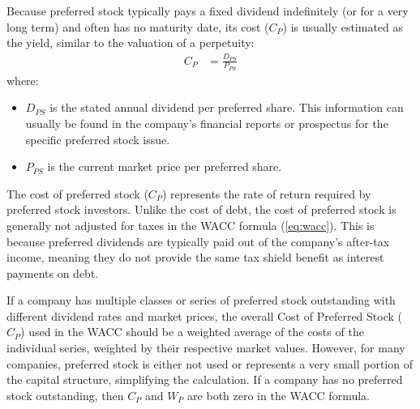 Because preferred stock typically pays a fixed dividend indefinitely (or for a very long term) and often has no maturity date, its cost (\(C_P\)) is usually estimated as the yield, similar to the valuation of a perpetuity:
\begin{align*}
    C_P & = \frac{D_{PS}}{P_{PS}}
\end{align*}
where:
\begin{itemize}
    \item \(D_{PS}\) is the stated annual dividend per preferred share. This information can usually be found in the company's financial reports or prospectus for the specific preferred stock issue.
    \item \(P_{PS}\) is the current market price per preferred share.
\end{itemize}

The cost of preferred stock (\(C_P\)) represents the rate of return required by preferred stock investors. Unlike the cost of debt, the cost of preferred stock is generally not adjusted for taxes in the WACC formula (\ref{eq:wacc}). This is because preferred dividends are typically paid out of the company's after-tax income, meaning they do not provide the same tax shield benefit as interest payments on debt.

If a company has multiple classes or series of preferred stock outstanding with different dividend rates and market prices, the overall Cost of Preferred Stock (\(C_P\)) used in the WACC should be a weighted average of the costs of the individual series, weighted by their respective market values. However, for many companies, preferred stock is either not used or represents a very small portion of the capital structure, simplifying the calculation. If a company has no preferred stock outstanding, then \(C_P\) and \(W_P\) are both zero in the WACC formula.